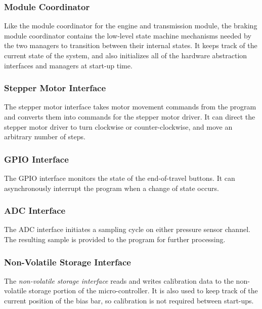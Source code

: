 \subsubsection{Module Coordinator}

Like the module coordinator for the engine and transmission module, the braking module coordinator contains the low-level state machine mechanisms needed by the two managers to transition between their internal states. It keeps track of the current state of the system, and also initializes all of the hardware abstraction interfaces and managers at start-up time. 

\subsubsection{Stepper Motor Interface}

The stepper motor interface takes motor movement commands from the program and converts them into commands for the stepper motor driver. It can direct the stepper motor driver to turn clockwise or counter-clockwise, and move an arbitrary number of steps. 

\subsubsection{GPIO Interface}

The GPIO interface monitors the state of the end-of-travel buttons. It can asynchronously interrupt the program when a change of state occurs. 

\subsubsection{ADC Interface}  

The ADC interface initiates a sampling cycle on either pressure sensor channel. The resulting sample is provided to  the program for further processing. 

\subsubsection{Non-Volatile Storage Interface}

The \emph{non-volatile storage interface} reads and writes calibration data to the non-volatile storage portion of the micro-controller. It is also used to keep track of the current position of the bias bar, so calibration is not required between start-ups.


